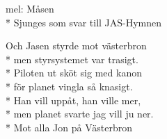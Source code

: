 \begin{SongText}[JASen]
    \begin{SongInfo}
        mel: Måsen\\*%
        Sjunges som svar till JAS-Hymnen
    \end{SongInfo}
    \begin{SongVerse}
        Och Jasen styrde mot västerbron\\*%
        men styrsystemet var trasigt.\\*%
        Piloten ut sköt sig med kanon\\*%
        för planet vingla så knasigt.\\*%
        Han vill uppåt, han ville mer,\\*%
        men planet svarte jag vill ju ner.\\*%
        Mot alla Jon på Västerbron
    \end{SongVerse}
\end{SongText}

